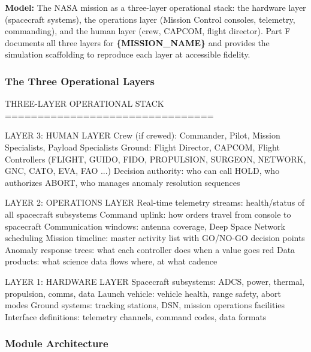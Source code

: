 \documentclass[11pt,letterpaper]{article}
\newcommand{\param}[1]{\textcolor{paramred}{\textbf{\{#1\}}}}
\begin{document}
\textbf{Model:} The NASA mission as a three-layer operational stack: the hardware layer (spacecraft systems), the operations layer (Mission Control consoles, telemetry, commanding), and the human layer (crew, CAPCOM, flight director). Part F documents all three layers for \param{MISSION\_NAME} and provides the simulation scaffolding to reproduce each layer at accessible fidelity.

\subsubsection{The Three Operational Layers}

\begin{asciibox}
THREE-LAYER OPERATIONAL STACK
================================

LAYER 3: HUMAN LAYER
  Crew (if crewed): Commander, Pilot, Mission Specialists, Payload Specialists
  Ground: Flight Director, CAPCOM, Flight Controllers (FLIGHT, GUIDO, FIDO,
          PROPULSION, SURGEON, NETWORK, GNC, CATO, EVA, FAO ...)
  Decision authority: who can call HOLD, who authorizes ABORT, who manages
  anomaly resolution sequences

LAYER 2: OPERATIONS LAYER
  Real-time telemetry streams: health/status of all spacecraft subsystems
  Command uplink: how orders travel from console to spacecraft
  Communication windows: antenna coverage, Deep Space Network scheduling
  Mission timeline: master activity list with GO/NO-GO decision points
  Anomaly response trees: what each controller does when a value goes red
  Data products: what science data flows where, at what cadence

LAYER 1: HARDWARE LAYER
  Spacecraft subsystems: ADCS, power, thermal, propulsion, comms, data
  Launch vehicle: vehicle health, range safety, abort modes
  Ground systems: tracking stations, DSN, mission operations facilities
  Interface definitions: telemetry channels, command codes, data formats
\end{asciibox}

\subsubsection{Module Architecture}
\end{document}
